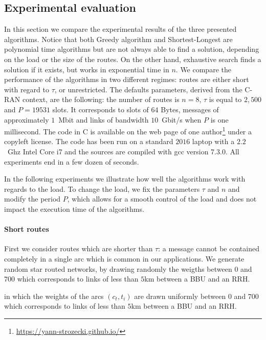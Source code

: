 \documentclass[10pt, conference, letterpaper]{IEEEtran}
\begin{document}
   \subsection{Experimental evaluation}\label{sec:exp_PAZL}
   
   In this section we compare the experimental results of the three presented algorithms.
      Notice that both Greedy algorithm and Shortest-Longest are polynomial time algorithms but are not always able to find a solution, depending on the load or the size of the routes. On the other hand, exhaustive search finds a solution if it exists, but works in exponential time in $n$. We compare the performance of the algorithms in two different regimes: routes are either short with regard to $\tau$, or unrestricted.
      The defaults parameters, derived from the C-RAN context, are the following: the number of routes is $n = 8$, $\tau$ is equal to $2,500$ and $P=19531$ slots. It corresponds to slots of $64$ Bytes, messages of approximately $1$~Mbit and links of bandwidth $10$~Gbit/s when $P$ is one millisecond. 
       The code in C is available on the web page of one author\footnote{\url{https://yann-strozecki.github.io/}} under a copyleft license. The code has been run on a standard $2016$ laptop with a $2.2$~Ghz Intel Core i7 and the sources are compiled with gcc version 7.3.0. All experiments end in a few dozen of seconds.

       In the following experiments we illustrate how well the algorithms work with regards to the load. To change the load, we fix the parameters $\tau$ and $n$ and modify the period $P$, which allows for a smooth control of the load and does not impact the execution time of the algorithms.
      

      \paragraph{Short routes}
      
      First we consider routes which are shorter than $\tau$: a message cannot be contained completely in a single arc which is common in our applications. We generate random star routed networks, by drawing randomly the weigths between $0$ and $700$ which corresponds to links of less than $5$km between a BBU and an RRH.

       in which the weights of the arcs $(c_t,t_i)$ are drawn uniformly between $0$ and $700$ which corresponds to links of less than $5$km between a BBU and an RRH. 
      
\end{document}
